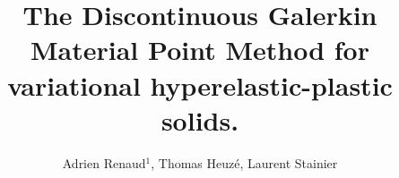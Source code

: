 \documentclass[final,3p,times]{elsarticle}
\begin{document}
\begin{frontmatter}



  
  \title{The Discontinuous Galerkin Material Point Method for variational hyperelastic-plastic solids.}
  
  
  \author{Adrien Renaud$^1$, Thomas Heuz{\'e}, Laurent Stainier}
  
  \address{$^1$ Research Institute in Civil and Mechanical Engineering (GeM, UMR 6183 CNRS)\\
    Ecole Centrale de Nantes \\
    1 rue de la No\"e, Nantes\\
    e-mail: \{adrien.renaud,thomas.heuze,laurent.stainier\}@ec-nantes.fr}
  

\end{frontmatter}
\end{document}
